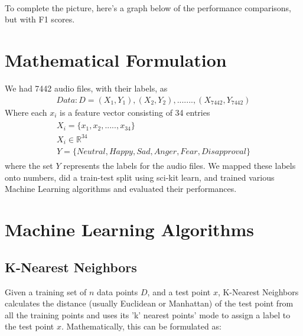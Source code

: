\documentclass[conference]{IEEEtran}
\begin{document}
\\
To complete the picture, here’s a graph below of the performance comparisons, but with F1 scores.


\section{Mathematical Formulation}
We had 7442 audio files, with their labels, as
\begin{align*}
Data: D = { (X_1, Y_1), (X_2, Y_2), ......., (X_{7442}, Y_{7442})}
\end{align*}
Where each $x_i$ is a feature vector consisting of 34 entries
\begin{align}
\begin{gathered}
X_i = \{x_1,x_2, ....., x_{34}\} \\
X_i\in \mathbb{R}^{34} \\
Y = \{Neutral, Happy, Sad, Anger, Fear, Disapproval\}
\end{gathered}
\end{align}
where the set $Y$ represents the labels for the audio files. We mapped these labels onto numbers, did a train-test split using sci-kit learn, and trained various Machine Learning algorithms and evaluated their performances.

\section{Machine Learning Algorithms}

\subsection{K-Nearest Neighbors}
Given a training set of $n$ data points $D$, and a test point $x$, K-Nearest Neighbors calculates the distance (usually Euclidean or Manhattan) of the test point from all the training points and uses its 'k' nearest points' mode to assign a label to the test point $x$. Mathematically, this can be formulated as:
\end{document}
